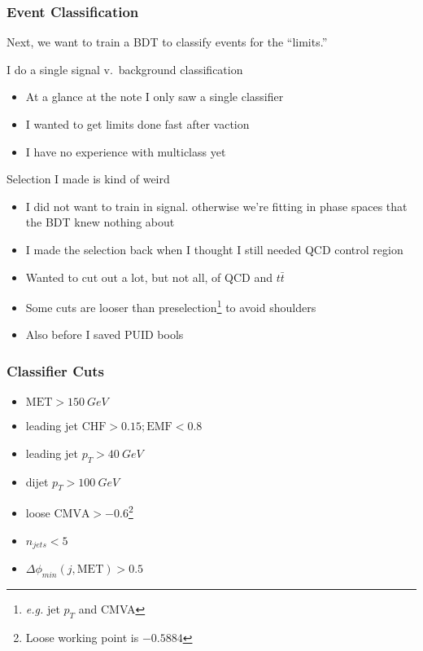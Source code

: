 \documentclass{beamer}
\newcommand{\ttbar}{\ensuremath{t\bar{t}}}
\begin{document}
\begin{frame}
  \frametitle{Event Classification}

  Next, we want to train a BDT to classify events for the ``limits.''

  I do a single signal v.~background classification
  \begin{itemize}
  \item At a glance at the note I only saw a single classifier
  \item I wanted to get limits done fast after vaction
  \item I have no experience with multiclass yet
  \end{itemize}

  Selection I made is kind of weird

  \begin{itemize}
  \item I did not want to train in signal.
    otherwise we're fitting in phase spaces that the BDT knew nothing about
  \item I made the selection back when I thought I still needed QCD control region
  \item Wanted to cut out a lot, but not all, of QCD and \ttbar
  \item Some cuts are looser than preselection\footnote{\emph{e.g.} jet $p_T$ and CMVA}
    to avoid shoulders
  \item Also before I saved PUID bools
  \end{itemize}

\end{frame}

\begin{frame}
  \frametitle{Classifier Cuts}
  \begin{itemize}
  \item $\mathrm{MET} > \SI{150}{GeV}$
  \item leading jet $\mathrm{CHF} > 0.15; \mathrm{EMF} < 0.8$
  \item leading jet $p_T > \SI{40}{GeV}$
  \item dijet $p_T > \SI{100}{GeV}$
  \item loose  $\mathrm{CMVA} > -0.6$\footnote{Loose working point is $-0.5884$}
  \item $n_{jets} < 5$
  \item $\Delta\phi_{min}(j, \mathrm{MET}) > 0.5$
  \end{itemize}
\end{frame}
\end{document}
